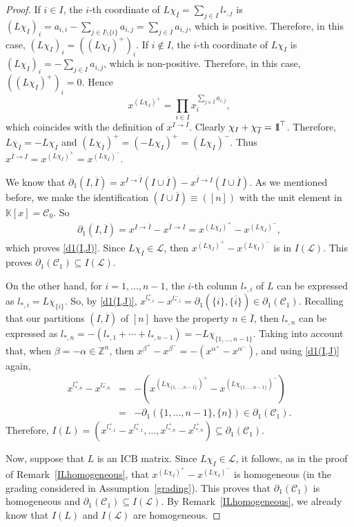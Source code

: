 \documentclass[ALCO]{cedram}
\newcommand{\mbz}{\mbox{$\mathbb{Z}$}}
\newcommand{\mbk}{\mbox{$\mathbb{K}$}}
\newcommand{\mbone}{\mbox{$1\mkern-4.6mu {\rm l}$}}
\newcommand{\mcc}{\mbox{$\mathcal{C}$}}
\newcommand{\mcl}{\mbox{$\mathcal{L}$}}
\newcommand{\icb}{\mbox{$\mathrm{ICB}$}}
\newcommand{\dif}{\mbox{$\partial$}}
\begin{document}
\begin{proof}
If $i\in I$, the $i$-th coordinate of $L\chi_I=\sum_{j\in I}l_{*,j}$
is $(L\chi_I)_i=a_{i,i}-\sum_{j\in
  I\setminus\{i\}}a_{i,j}=\sum_{j\in\overline{I}}a_{i,j}$, which is
positive. Therefore, in this case, $(L\chi_I)_i=((L\chi_I)^+)_i$.  If
$i\not\in I$, the $i$-th coordinate of $L\chi_I$ is
$(L\chi_I)_i=-\sum_{j\in I}a_{i,j}$, which is non-positive. Therefore,
in this case, $((L\chi_I)^+)_i=0$. Hence
\[
x^{(L\chi_I)^{+}}=\prod_{i\in
  I}x_i^{\sum_{j\in\overline{I}}a_{i,j}},
\]
which coincides with the
definition of $x^{I\to\overline{I}}$. Clearly
$\chi_I+\chi_{\overline{I}}=\mbone^{\top}$. Therefore,
$L\chi_{\overline{I}}=-L\chi_I$ and
$(L\chi_{\overline{I}})^+=(-L\chi_I)^+=(L\chi_I)^-$. Thus
$x^{\overline{I}\to I}=x^{(L\chi_{\overline{I}})^+}=x^{(L\chi_I)^-}$.

We know that $\dif_1(I,\overline{I})=x^{I\to \overline{I}}(I\cup
\overline{I})-x^{\overline{I}\to I}(I\cup \overline{I})$. As we
mentioned before, we make the identification $(I\cup
\overline{I})\equiv ([n])$ with the unit element in $\mbk[x]=\mcc_0$. So
\begin{eqnarray*}
\dif_1(I,\overline{I})=x^{I\to \overline{I}}-x^{\overline{I}\to
  I}=x^{(L\chi_I)^+}-x^{(L\chi_I)^-}, 
\end{eqnarray*}
which proves \eqref{d1(I,J)}. Since $L\chi_I\in\mcl$, then
$x^{(L\chi_I)^+}-x^{(L\chi_I)^-}$ is in $I(\mcl)$. This proves
$\dif_1(\mcc_1)\subseteq I(\mcl)$.

On the other hand, for $i=1,\ldots, n-1$, the $i$-th column $l_{*,i}$
of $L$ can be expressed as $l_{*,i}=L\chi_{\{i\}}$.  So, by
\eqref{d1(I,J)},
$x^{l_{*,i}^+}-x^{l_{*,i}^-}=\dif_1(\{i\},\overline{\{i\}})\in
\dif_1(\mcc_1)$.  Recalling that our partitions $(I,\overline{I})$ of
$[n]$ have the property $n\in \overline{I}$, then $l_{*,n}$ can be
expressed as $l_{*,n}=-(l_{*,1}+\cdots +l_{*,n-1})=-L\chi_{\{1,\ldots
  ,n-1\}}$. Taking into account that, when $\beta=-\alpha\in\mbz^n$,
then $x^{\beta^+}-x^{\beta^-}=-(x^{\alpha^+}-x^{\alpha^-})$, and using
\eqref{d1(I,J)} again,
\begin{eqnarray*}
x^{l_{*,n}^+}-x^{l_{*,n}^-} & = &
  -(x^{(L\chi_{\{1,\ldots,n-1\}})^+}-x^{(L\chi_{\{1,\ldots
      ,n-1\}})^-})\\ &=& -\dif_1(\{1,\ldots ,n-1\},\{n\})\in
  \dif_1(\mcc_1).
\end{eqnarray*}
Therefore, $I(L)=(x^{l_{*,1}^+}-x^{l_{*,1}^+},\ldots
,x^{l_{*,n}^+}-x^{l_{*,n}^+})\subseteq \dif_1(\mcc_1)$.

Now, suppose that $L$ is an $\icb$ matrix. Since $L\chi_I\in\mcl$, it
follows, as in the proof of Remark~\ref{ILhomogeneous}, that
$x^{(L\chi_I)^+}-x^{(L\chi_I)^-}$ is homogeneous (in the grading
considered in Assumption~\ref{grading}). This proves that
$\dif_1(\mcc_1)$ is homogeneous and $\dif_1(\mcc_1)\subseteq
I(\mcl)$. By Remark~\ref{ILhomogeneous}, we already know that $I(L)$
and $I(\mcl)$ are homogeneous.
\end{proof}
\end{document}
